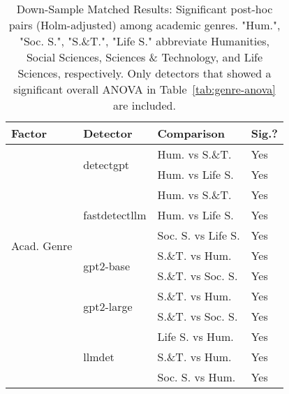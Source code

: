 \begin{table*}[ht!]
\centering
\small
\begin{tabular}{llll}
\toprule
\textbf{Factor} & \textbf{Detector} & \textbf{Comparison} & \textbf{Sig.?} \\
\midrule
\multirow{10}{*}{Acad. Genre} & \multirow{2}{*}{detectgpt}
 & Hum. vs S.\&T. & Yes \\
 &  & Hum. vs Life S.  & Yes \\
\cmidrule(lr){2-4}
 & \multirow{3}{*}{fastdetectllm}
 & Hum. vs S.\&T. & Yes \\
 &  & Hum. vs Life S.  & Yes \\
 & & Soc. S. vs Life S. & Yes \\
 \cmidrule(lr){2-4}
 & \multirow{2}{*}{gpt2-base}
 & S.\&T. vs Hum. & Yes \\
 &  & S.\&T. vs Soc. S. & Yes \\
\cmidrule(lr){2-4}
 & \multirow{2}{*}{gpt2-large}
 & S.\&T. vs Hum. & Yes \\
 &  & S.\&T. vs Soc. S. & Yes \\
\cmidrule(lr){2-4}
 & \multirow{3}{*}{llmdet}
 & Life S. vs Hum. & Yes \\
 &  & S.\&T. vs Hum. & Yes \\
 &  & Soc. S. vs Hum. & Yes \\

\bottomrule
\end{tabular}
\caption{Down-Sample Matched Results: Significant post-hoc pairs (Holm-adjusted) among academic genres. "Hum.", "Soc. S.", "S.\&T.", "Life S." abbreviate Humanities, Social Sciences, Sciences \& Technology, and Life Sciences, respectively. Only detectors that showed a significant overall ANOVA in Table~\ref{tab:genre-anova} are included.}
\label{tab:genre-posthoc}
\end{table*}
